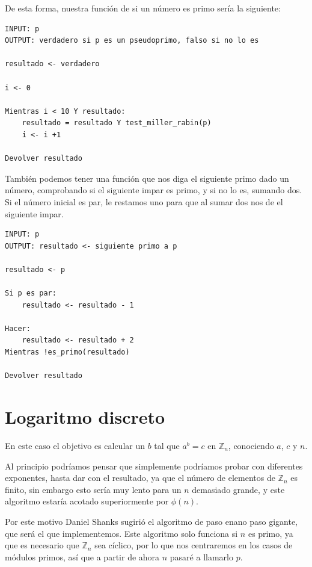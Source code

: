 \documentclass[12pt, spanish]{article}
\begin{document}
De esta forma, nuestra función de si un número es primo sería la siguiente:

\begin{lstlisting}[caption={Función para comprobar si un numero es primo}]
INPUT: p
OUTPUT: verdadero si p es un pseudoprimo, falso si no lo es

resultado <- verdadero

i <- 0

Mientras i < 10 Y resultado:
	resultado = resultado Y test_miller_rabin(p)
	i <- i +1

Devolver resultado
\end{lstlisting}

También podemos tener una función que nos diga el siguiente primo dado un número, comprobando si el siguiente impar es primo, y si no lo es, sumando dos. Si el número inicial es par, le restamos uno para que al sumar dos nos de el siguiente impar.

\begin{lstlisting}[caption={Función para encontrar el siguiente primo}]
INPUT: p
OUTPUT: resultado <- siguiente primo a p

resultado <- p

Si p es par:
	resultado <- resultado - 1

Hacer:
	resultado <- resultado + 2
Mientras !es_primo(resultado)

Devolver resultado
\end{lstlisting}


\section{Logaritmo discreto}

En este caso el objetivo es calcular un $b$ tal que $a^b = c$ en $\mathbb{Z}_n$, conociendo $a$, $c$ y $n$.

Al principio podríamos pensar que simplemente podríamos probar con diferentes exponentes, hasta dar con el resultado, ya que el número de elementos de $\mathbb{Z}_n$ es finito, sin embargo esto sería muy lento para un $n$ demasiado grande, y este algoritmo estaría acotado superiormente por $\phi(n)$.

Por este motivo Daniel Shanks sugirió el algoritmo de paso enano paso gigante, que será el que implementemos. Este algoritmo solo funciona si $n$ es primo, ya que es necesario que $\mathbb{Z}_n$ sea cíclico, por lo que nos centraremos en los casos de módulos primos, así que a partir de ahora $n$ pasaré a llamarlo $p$.
\end{document}
